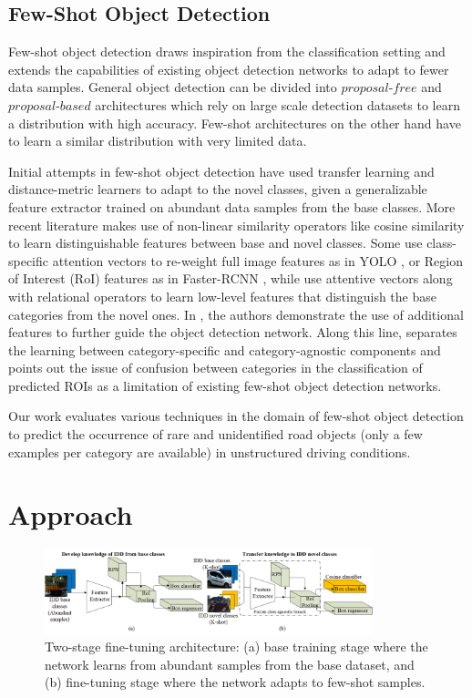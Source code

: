 \documentclass[letterpaper]{article} %
\begin{document}
\subsection{Few-Shot Object Detection}
\label{related:fsod}
Few-shot object detection draws inspiration from the classification setting and extends the capabilities of existing object detection networks \cite{yolo2,faster-rcnn} to adapt to fewer data samples. General object detection can be divided into $proposal$-$free$ \cite{yolo2,retinanet,polyyolo} and $proposal$-$based$ \cite{faster-rcnn,fpn} architectures which rely on large scale detection datasets to learn a distribution with high accuracy. Few-shot architectures on the other hand have to learn a similar distribution with very limited data.

Initial attempts in few-shot object detection have used transfer learning \cite{lstd} and distance-metric learners \cite{repmet} to adapt to the novel classes, given a generalizable feature extractor trained on abundant data samples from the base classes. More recent literature makes use of non-linear similarity operators like cosine similarity \cite{fsdet} to learn distinguishable features between base and novel classes. Some use class-specific attention vectors to re-weight full image features as in YOLO \cite{reweight}, or Region of Interest (RoI) features as in Faster-RCNN \cite{metarcnn}, while \cite{fgn,fsod} use attentive vectors along with relational operators \cite{relation-net} to learn low-level features that distinguish the base categories from the novel ones. In \cite{addfeat}, the authors demonstrate the use of additional features to further guide the object detection network.
Along this line, \cite{metadet} separates the learning between category-specific and category-agnostic components and points out the issue of confusion between categories in the classification of predicted ROIs as a limitation of existing few-shot object detection networks.

Our work evaluates various techniques in the domain of few-shot object detection to predict the occurrence of rare and unidentified road objects (only a few examples per category are available) in unstructured driving conditions.

\section{Approach}
\label{approach}
\begin{figure}[t]
\centering
\includegraphics[width=0.85\textwidth]{two_stage_finetune}
\caption{Two-stage fine-tuning architecture: (a) base training stage where the network learns from abundant samples from the base dataset, and (b) fine-tuning stage where the network adapts to few-shot samples.}
\label{fig_tfa}
\end{figure}
\end{document}
